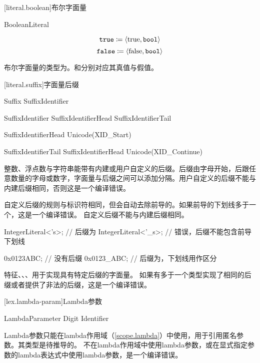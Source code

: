 [literal.boolean]{布尔字面量}

\begin{bnf}{BooleanLiteral}
     \br
\end{bnf}

$$ \texttt{true} \coloneqq \langle \mathrm{true}, \texttt{bool} \rangle $$
$$ \texttt{false} \coloneqq \langle \mathrm{false}, \texttt{bool} \rangle $$

\pnum
布尔字面量的类型为。和分别对应其真值与假值。

[literal.suffix]{字面量后缀}

\begin{bnf}{Suffix}
    \terminal{_}\bnfq SuffixIdentifier
\end{bnf}

\begin{bnf}{SuffixIdentifier}
    SuffixIdentifierHead SuffixIdentifierTail\bnfs
\end{bnf}

\begin{bnf}{SuffixIdentifierHead}
    Unicode(XID_Start)
\end{bnf}

\begin{bnf}{SuffixIdentifierTail}
    SuffixIdentifierHead \br
    Unicode(XID_Continue)
\end{bnf}

\pnum
整数、浮点数与字符串能带有内建或用户自定义的后缀。后缀由字母开始，后跟任意数量的字母或数字，字面量与后缀之间可以添加\tcode{_}分隔。用户自定义的后缀不能与内建后缀相同，否则这是一个编译错误。

\pnum
自定义后缀的规则与标识符相同，但会自动去除前导的\tcode{_}。如果前导的下划线多于一个，这是一个编译错误。
自定义后缀不能与内建后缀相同。

\enterexample
\begin{codeblock}
IntegerLiteral<'s>; // 后缀为
IntegerLiteral<'_s>; // 错误，后缀不能包含前导下划线

0x0123ABC; // 没有后缀
0x0123_ABC; // 后缀为，下划线用作区分
\end{codeblock}
\exitexample

\pnum
特征、、、用于实现具有特定后缀的字面量。
如果有多于一个类型实现了相同的后缀或者提供了非法的后缀，这是一个编译错误。

[lex.lambda-param]{Lambda参数}

\begin{bnf}{LambdaParameter}
    \terminal{\$} Digit\bnfp \br
    \terminal{\$} Identifier
\end{bnf}

\pnum
Lambda参数只能在lambda作用域（\ref{scope.lambda}）中使用，用于引用匿名参数。其类型是待推导的。
不在lambda作用域中使用lambda参数，或在显式指定参数的lambda表达式中使用lambda参数，是一个编译错误。